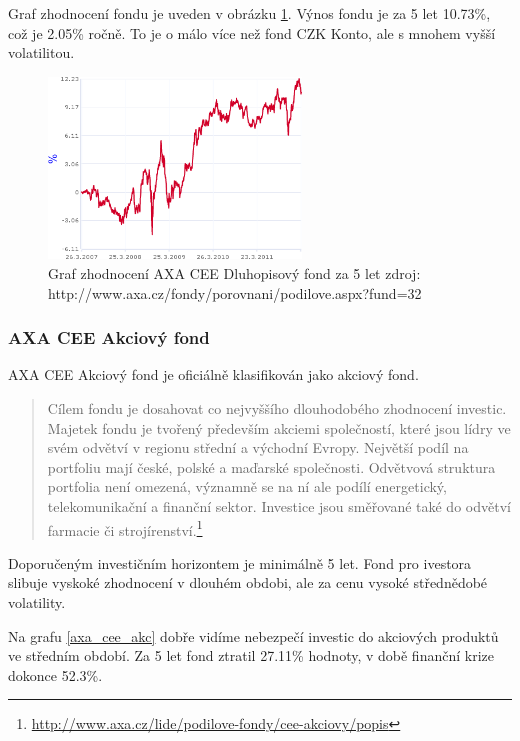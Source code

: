 \documentclass[a4paper,12pt]{article}
\begin{document}
			Graf zhodnocení fondu je uveden v obrázku \ref{axa_cee_dluh}. Výnos fondu je za 5 let 10.73\%, což je 2.05\% ročně. To je o málo více než fond CZK Konto, ale s mnohem vyšší volatilitou.
			
			\begin{figure}[h!]
		  	\centering
				\includegraphics[width=0.6\textwidth]{axa_cee_dluh.png}			
				\caption{Graf zhodnocení AXA CEE Dluhopisový fond za 5 let zdroj: http://www.axa.cz/fondy/porovnani/podilove.aspx?fund=32}
				\label{axa_cee_dluh}
			\end{figure}
		\subsubsection{AXA CEE Akciový fond}
			AXA CEE Akciový fond je oficiálně klasifikován jako akciový fond.
			\begin{quote}
				Cílem fondu je dosahovat co nejvyššího dlouhodobého zhodnocení investic. Majetek fondu je tvořený především akciemi společností, které jsou lídry ve svém odvětví v regionu střední a východní Evropy. Největší podíl na portfoliu mají české, polské a maďarské společnosti. Odvětvová struktura portfolia není omezená, významně se na ní ale podílí energetický, telekomunikační a finanční sektor. Investice jsou směřované také do odvětví farmacie či strojírenství.\footnote{\url{http://www.axa.cz/lide/podilove-fondy/cee-akciovy/popis}}
			\end{quote}
			
			Doporučeným investičním horizontem je minimálně 5 let. Fond pro ivestora slibuje vyskoké zhodnocení v dlouhém obdobi, ale za cenu vysoké střednědobé volatility.
			
			Na grafu \ref{axa_cee_akc} dobře vidíme nebezpečí investic do akciových produktů ve středním období. Za 5 let fond ztratil 27.11\% hodnoty, v době finanční krize dokonce 52.3\%.			
			
\end{document}
